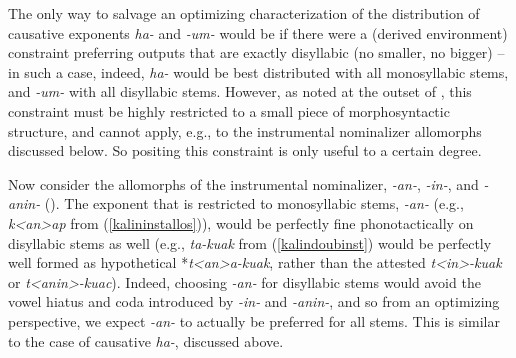 \documentclass[output=paper]{langscibook}
\begin{document}
The only way to salvage an optimizing characterization of the distribution of causative exponents \textit{ha-} and \textit{-um-} would be if there were a (derived environment) constraint preferring outputs that are exactly disyllabic (no smaller, no bigger) -- in such a case, indeed, \textit{ha-} would be best distributed with all monosyllabic stems, and \textit{-um-} with all disyllabic stems. However, as noted at the outset of , this constraint must be highly restricted to a small piece of morphosyntactic structure, and cannot apply, e.g., to the instrumental nominalizer allomorphs discussed below. So positing this constraint is only useful to a certain degree.

\begin{sloppypar}
Now consider the allomorphs of the instrumental nominalizer, \textit{-an-}, \textit{-in-}, and \textit{-anin-} (). The exponent that is restricted to monosyllabic stems, \textit{-an-} (e.g., \textit{k<an>ap} from (\ref{kalininstallos})), would be perfectly fine phonotactically on disyllabic stems as well (e.g., \textit{ta-kuak} from (\ref{kalindoubinst}) would be perfectly well formed as hypothetical *\textit{t<an>a-kuak}, rather than the attested \textit{t<in>-kuak} or \textit{t<anin>-kuac}). Indeed, choosing \textit{-an-} for disyllabic stems would avoid the vowel hiatus and coda introduced by \textit{-in-} and \textit{-anin-}, and so from an optimizing perspective, we expect \textit{-an-} to actually be preferred for all stems. This is similar to the case of causative \textit{ha-}, discussed above.
\end{sloppypar}
\end{document}
